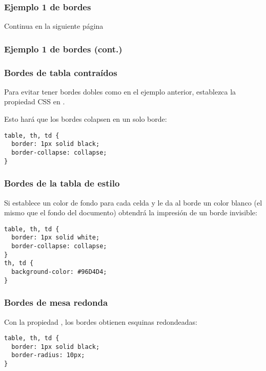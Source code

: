 \begin{frame}[fragile]
  \frametitle{Ejemplo 1 de bordes}
  
  Continua en la siguiente página
\end{frame}

\begin{frame}[fragile]
  \frametitle{Ejemplo 1 de bordes (cont.)}
  
\end{frame}

\begin{frame}[fragile]
  \frametitle{Bordes de tabla contraídos}

  Para evitar tener bordes dobles como en el ejemplo anterior,
  establezca la propiedad  CSS en .

  \vspace{\baselineskip}
  Esto hará que los bordes colapsen en un solo borde:

  \vspace{\baselineskip}
  \begin{lstlisting}
table, th, td {
  border: 1px solid black;
  border-collapse: collapse;
}
  \end{lstlisting}
\end{frame}

\begin{frame}[fragile]
  \frametitle{Bordes de la tabla de estilo}

  Si establece un color de fondo para cada celda y le da al
  borde un color blanco (el mismo que el fondo del documento)
  obtendrá la impresión de un borde invisible:

  \vspace{\baselineskip}
  \begin{lstlisting}
table, th, td {
  border: 1px solid white;
  border-collapse: collapse;
}
th, td {
  background-color: #96D4D4;
}
  \end{lstlisting}
\end{frame}

\begin{frame}[fragile]
  \frametitle{Bordes de mesa redonda}

  Con la propiedad , los bordes obtienen
  esquinas redondeadas:

  \vspace{\baselineskip}
  \begin{lstlisting}
table, th, td {
  border: 1px solid black;
  border-radius: 10px;
}
  \end{lstlisting}
\end{frame}

